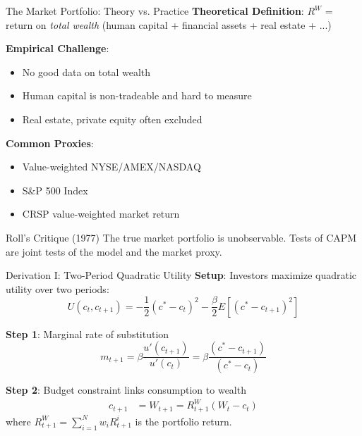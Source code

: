 \documentclass{beamer}
\begin{document}
\begin{frame}{The Market Portfolio: Theory vs. Practice}
	\textbf{Theoretical Definition}: $R^W$ = return on \textit{total wealth} (human capital + financial assets + real estate + ...)
	
	\vspace{8pt}
	\textbf{Empirical Challenge}:
	\begin{itemize}
		\item No good data on total wealth
		\item Human capital is non-tradeable and hard to measure
		\item Real estate, private equity often excluded
	\end{itemize}
	
	\vspace{8pt}
	\textbf{Common Proxies}:
	\begin{itemize}
		\item Value-weighted NYSE/AMEX/NASDAQ
		\item S\&P 500 Index
		\item CRSP value-weighted market return
	\end{itemize}
	
	\vspace{8pt}
	\begin{alertblock}{Roll's Critique (1977)}
		The true market portfolio is unobservable. Tests of CAPM are joint tests of the model and the market proxy.
	\end{alertblock}
\end{frame}

\begin{frame}{Derivation I: Two-Period Quadratic Utility}
	\textbf{Setup}: Investors maximize quadratic utility over two periods:
	\begin{equation*}
		U(c_t, c_{t+1}) = -\frac{1}{2}(c^* - c_t)^2 - \frac{\beta}{2} E[(c^* - c_{t+1})^2]
	\end{equation*}
	
	\vspace{5pt}
	\textbf{Step 1}: Marginal rate of substitution
	\begin{equation*}
		m_{t+1} = \beta \frac{u'(c_{t+1})}{u'(c_t)} = \beta \frac{(c^* - c_{t+1})}{(c^* - c_t)}
	\end{equation*}
	
	\vspace{5pt}
	\textbf{Step 2}: Budget constraint links consumption to wealth
	\begin{align*}
		c_{t+1} &= W_{t+1} = R^W_{t+1}(W_t - c_t)
	\end{align*}
	where $R^W_{t+1} = \sum_{i=1}^{N} w_i R^i_{t+1}$ is the portfolio return.
\end{frame}
\end{document}
